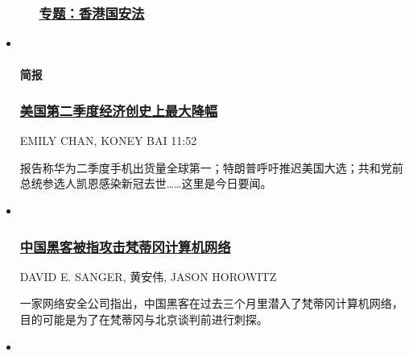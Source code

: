 \begin{itemize}
\begin{itemize}
{    \subsubsection{\texorpdfstring{\href{https://cn.nytimes.com/topic/20200701/hong-kong-national-security-law/}{专题：香港国安法}}{专题：香港国安法}}\label{ux4e13ux9898ux9999ux6e2fux56fdux5b89ux6cd5}}
  \end{itemize}
\item ~
  \hypertarget{ux7b80ux62a5}{%
  \paragraph{简报}\label{ux7b80ux62a5}}

  \hypertarget{ux7f8eux56fdux7b2cux4e8cux5b63ux5ea6ux7ecfux6d4eux521bux53f2ux4e0aux6700ux5927ux964dux5e45}{%
  \subsubsection{\texorpdfstring{\href{/morning-brief/20200731/coronavirus-china-qurantine-lee-teng-hui-dead/}{美国第二季度经济创史上最大降幅}}{美国第二季度经济创史上最大降幅}}\label{ux7f8eux56fdux7b2cux4e8cux5b63ux5ea6ux7ecfux6d4eux521bux53f2ux4e0aux6700ux5927ux964dux5e45}}

  EMILY CHAN, KONEY BAI 11:52

  \href{/morning-brief/20200731/coronavirus-china-qurantine-lee-teng-hui-dead/}{}

  报告称华为二季度手机出货量全球第一；特朗普呼吁推迟美国大选；共和党前总统参选人凯恩感染新冠去世\ldots{}\ldots{}这里是今日要闻。
\item ~
  \hypertarget{ux4e2dux56fdux9ed1ux5ba2ux88abux6307ux653bux51fbux68b5ux8482ux5188ux8ba1ux7b97ux673aux7f51ux7edc}{%
  \subsubsection{\texorpdfstring{\href{/world/20200729/china-vatican-hack/}{中国黑客被指攻击梵蒂冈计算机网络}}{中国黑客被指攻击梵蒂冈计算机网络}}\label{ux4e2dux56fdux9ed1ux5ba2ux88abux6307ux653bux51fbux68b5ux8482ux5188ux8ba1ux7b97ux673aux7f51ux7edc}}

  DAVID E. SANGER, 黄安伟, JASON HOROWITZ

  \href{/world/20200729/china-vatican-hack/}{}

  一家网络安全公司指出，中国黑客在过去三个月里潜入了梵蒂冈计算机网络，目的可能是为了在梵蒂冈与北京谈判前进行刺探。
\item ~
  \hypertarget{ux9999ux6e2fux5927ux5b66ux89e3ux96c7ux96e8ux4f1eux8fd0ux52a8ux9886ux8896ux6234ux8000ux5ef7}{%
}
\end{itemize}
